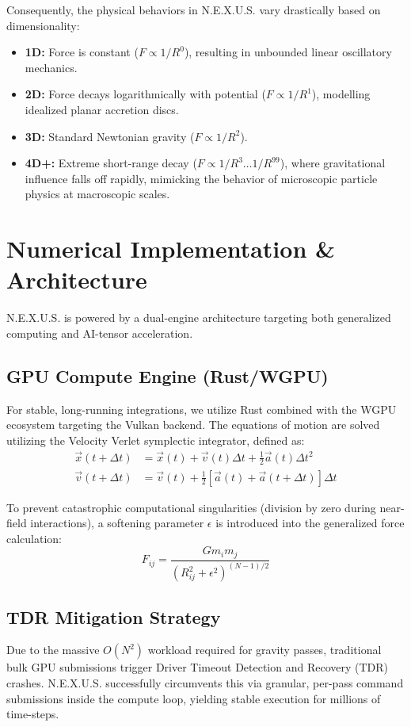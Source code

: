 \documentclass[11pt,a4paper]{article}
\begin{document}
Consequently, the physical behaviors in N.E.X.U.S. vary drastically based on dimensionality:
\begin{itemize}
    \item \textbf{1D:} Force is constant ($F \propto 1/R^0$), resulting in unbounded linear oscillatory mechanics.
    \item \textbf{2D:} Force decays logarithmically with potential ($F \propto 1/R^1$), modelling idealized planar accretion discs.
    \item \textbf{3D:} Standard Newtonian gravity ($F \propto 1/R^2$).
    \item \textbf{4D+:} Extreme short-range decay ($F \propto 1/R^3 \dots 1/R^{99}$), where gravitational influence falls off rapidly, mimicking the behavior of microscopic particle physics at macroscopic scales.
\end{itemize}

\section{Numerical Implementation \& Architecture}

N.E.X.U.S. is powered by a dual-engine architecture targeting both generalized computing and AI-tensor acceleration.

\subsection{GPU Compute Engine (Rust/WGPU)}
For stable, long-running integrations, we utilize Rust combined with the WGPU ecosystem targeting the Vulkan backend. The equations of motion are solved utilizing the Velocity Verlet symplectic integrator, defined as:
\begin{align}
    \vec{x}(t + \Delta t) &= \vec{x}(t) + \vec{v}(t)\Delta t + \frac{1}{2}\vec{a}(t)\Delta t^2 \\
    \vec{v}(t + \Delta t) &= \vec{v}(t) + \frac{1}{2} \left[ \vec{a}(t) + \vec{a}(t + \Delta t) \right] \Delta t
\end{align}

To prevent catastrophic computational singularities (division by zero during near-field interactions), a softening parameter $\epsilon$ is introduced into the generalized force calculation:
\begin{equation}
    F_{ij} = \frac{G m_i m_j}{(R_{ij}^2 + \epsilon^2)^{(N-1)/2}}
\end{equation}

\subsection{TDR Mitigation Strategy}
Due to the massive $O(N^2)$ workload required for gravity passes, traditional bulk GPU submissions trigger Driver Timeout Detection and Recovery (TDR) crashes. N.E.X.U.S. successfully circumvents this via granular, per-pass command submissions inside the compute loop, yielding stable execution for millions of time-steps.
\end{document}
